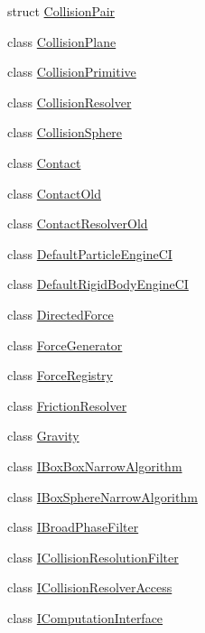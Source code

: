 \begin{DoxyCompactItemize}
\item 
struct \mbox{\hyperlink{structr3_1_1_collision_pair}{Collision\+Pair}}
\item 
class \mbox{\hyperlink{classr3_1_1_collision_plane}{Collision\+Plane}}
\item 
class \mbox{\hyperlink{classr3_1_1_collision_primitive}{Collision\+Primitive}}
\item 
class \mbox{\hyperlink{classr3_1_1_collision_resolver}{Collision\+Resolver}}
\item 
class \mbox{\hyperlink{classr3_1_1_collision_sphere}{Collision\+Sphere}}
\item 
class \mbox{\hyperlink{classr3_1_1_contact}{Contact}}
\item 
class \mbox{\hyperlink{classr3_1_1_contact_old}{Contact\+Old}}
\item 
class \mbox{\hyperlink{classr3_1_1_contact_resolver_old}{Contact\+Resolver\+Old}}
\item 
class \mbox{\hyperlink{classr3_1_1_default_particle_engine_c_i}{Default\+Particle\+Engine\+CI}}
\item 
class \mbox{\hyperlink{classr3_1_1_default_rigid_body_engine_c_i}{Default\+Rigid\+Body\+Engine\+CI}}
\item 
class \mbox{\hyperlink{classr3_1_1_directed_force}{Directed\+Force}}
\item 
class \mbox{\hyperlink{classr3_1_1_force_generator}{Force\+Generator}}
\item 
class \mbox{\hyperlink{classr3_1_1_force_registry}{Force\+Registry}}
\item 
class \mbox{\hyperlink{classr3_1_1_friction_resolver}{Friction\+Resolver}}
\item 
class \mbox{\hyperlink{classr3_1_1_gravity}{Gravity}}
\item 
class \mbox{\hyperlink{classr3_1_1_i_box_box_narrow_algorithm}{I\+Box\+Box\+Narrow\+Algorithm}}
\item 
class \mbox{\hyperlink{classr3_1_1_i_box_sphere_narrow_algorithm}{I\+Box\+Sphere\+Narrow\+Algorithm}}
\item 
class \mbox{\hyperlink{classr3_1_1_i_broad_phase_filter}{I\+Broad\+Phase\+Filter}}
\item 
class \mbox{\hyperlink{classr3_1_1_i_collision_resolution_filter}{I\+Collision\+Resolution\+Filter}}
\item 
class \mbox{\hyperlink{classr3_1_1_i_collision_resolver_access}{I\+Collision\+Resolver\+Access}}
\item 
class \mbox{\hyperlink{classr3_1_1_i_computation_interface}{I\+Computation\+Interface}}

\end{DoxyCompactItemize}
